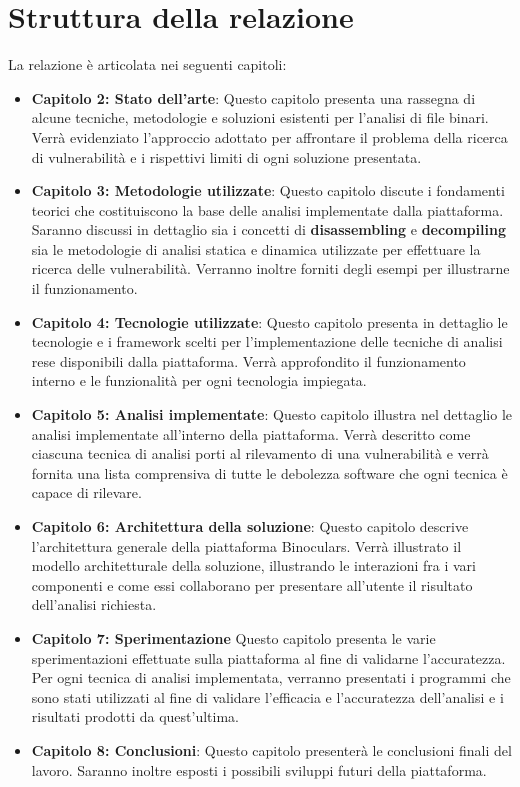 \documentclass[../main.tex]{subfiles}
\begin{document}
\section{Struttura della relazione}
La relazione è articolata nei seguenti capitoli:
\begin{itemize}
    \item \textbf{Capitolo 2: Stato dell'arte}: Questo capitolo presenta una rassegna di alcune tecniche, metodologie e soluzioni esistenti per l'analisi di file binari. Verrà evidenziato l'approccio adottato per affrontare il problema della ricerca di vulnerabilità e i
    rispettivi limiti di ogni soluzione presentata.
    \item \textbf{Capitolo 3: Metodologie utilizzate}: Questo capitolo discute i fondamenti teorici che costituiscono la base delle analisi implementate dalla piattaforma. Saranno discussi in dettaglio sia i concetti di \textbf{disassembling} e \textbf{decompiling} sia
    le metodologie di analisi statica e dinamica utilizzate per effettuare la ricerca delle vulnerabilità. Verranno inoltre forniti degli esempi per illustrarne il funzionamento.
    \item \textbf{Capitolo 4: Tecnologie utilizzate}: Questo capitolo presenta in dettaglio le tecnologie e i framework scelti per l'implementazione delle tecniche di analisi rese disponibili dalla piattaforma. Verrà approfondito il funzionamento interno e le funzionalità per ogni tecnologia impiegata.
    \item \textbf{Capitolo 5: Analisi implementate}: Questo capitolo illustra nel dettaglio le analisi implementate all'interno della piattaforma. Verrà descritto come ciascuna tecnica di analisi porti al rilevamento di una vulnerabilità e verrà fornita una lista comprensiva di tutte le debolezza software che ogni tecnica è capace di rilevare.
    \item \textbf{Capitolo 6: Architettura della soluzione}: Questo capitolo descrive l'architettura generale della piattaforma Binoculars. Verrà illustrato il modello architetturale della soluzione, illustrando le interazioni fra i vari componenti e come essi collaborano per presentare all'utente il risultato dell'analisi richiesta.   
    \item \textbf{Capitolo 7: Sperimentazione} Questo capitolo presenta le varie sperimentazioni effettuate sulla piattaforma al fine di validarne l'accuratezza. Per ogni tecnica di analisi implementata, verranno presentati i programmi che sono stati utilizzati al fine di validare l'efficacia e l'accuratezza dell'analisi e i risultati prodotti da quest'ultima.
    \item \textbf{Capitolo 8: Conclusioni}: Questo capitolo presenterà le conclusioni finali del lavoro. Saranno inoltre esposti i possibili sviluppi futuri della piattaforma.
\end{itemize}
\end{document}
